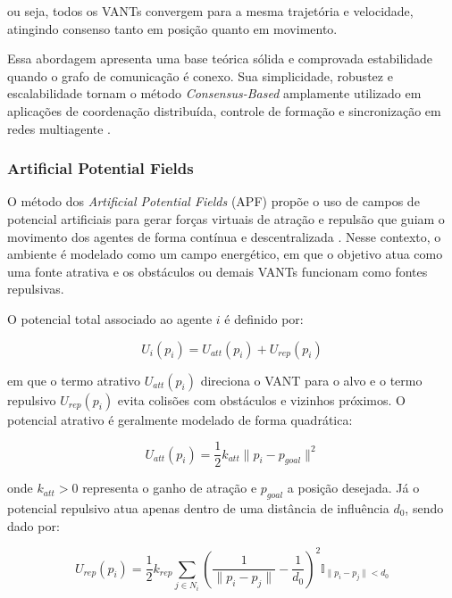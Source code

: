 ou seja, todos os VANTs convergem para a mesma trajetória e velocidade, atingindo consenso tanto em posição quanto em movimento.

Essa abordagem apresenta uma base teórica sólida e comprovada estabilidade quando o grafo de comunicação é conexo. Sua simplicidade, robustez e escalabilidade tornam o método \textit{Consensus-Based} amplamente utilizado em aplicações de coordenação distribuída, controle de formação e sincronização em redes multiagente \citep{olfati2007consensus, ren2008distributed}.


\subsubsection{Artificial Potential Fields}

O método dos \textit{Artificial Potential Fields} (APF) propõe o uso de campos de potencial artificiais para gerar forças virtuais de atração e repulsão que guiam o movimento dos agentes de forma contínua e descentralizada \citep{khatib1986real, bu2024advancement, ouyang2023formation}. Nesse contexto, o ambiente é modelado como um campo energético, em que o objetivo atua como uma fonte atrativa e os obstáculos ou demais VANTs funcionam como fontes repulsivas.

O potencial total associado ao agente $i$ é definido por:

\begin{equation}
U_i(p_i) = U_{att}(p_i) + U_{rep}(p_i)
\end{equation}

em que o termo atrativo $U_{att}(p_i)$ direciona o VANT para o alvo e o termo repulsivo $U_{rep}(p_i)$ evita colisões com obstáculos e vizinhos próximos. O potencial atrativo é geralmente modelado de forma quadrática:

\begin{equation}
U_{att}(p_i) = \frac{1}{2} k_{att} \|p_i - p_{goal}\|^2
\end{equation}

onde $k_{att} > 0$ representa o ganho de atração e $p_{goal}$ a posição desejada. Já o potencial repulsivo atua apenas dentro de uma distância de influência $d_0$, sendo dado por:

\begin{equation}
U_{rep}(p_i) =
\frac{1}{2} k_{rep} 
\sum_{j \in N_i}
\left(
\frac{1}{\|p_i - p_j\|} - \frac{1}{d_0}
\right)^2
\mathbb{I}_{\|p_i - p_j\| < d_0}
\end{equation}

